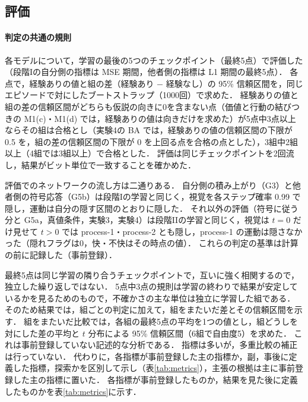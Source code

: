 \subsection{評価}\label{sec:evaluation}

\paragraph{判定の共通の規則}
各モデルについて，学習の最後の5つのチェックポイント（最終5点）で評価した（段階Iの自分側の指標は MSE 期間，他者側の指標は L1 期間の最終5点）．
各点で，経験ありの値と組の差（経験あり $-$ 経験なし）の 95\% 信頼区間を，同じエピソードで対にしたブートストラップ（1000回）で求めた．
経験ありの値と組の差の信頼区間がどちらも仮説の向きに0を含まない点（価値と行動の結びつきの M1(c)・M1(d) では，経験ありの値は向きだけを求めた）が5点中3点以上ならその組は合格とし（実験4の BA では，経験ありの値の信頼区間の下限が 0.5 を，組の差の信頼区間の下限が 0 を上回る点を合格の点とした），3組中2組以上（4組では3組以上）で合格とした．
評価は同じチェックポイントを2回流し，結果がビット単位で一致することを確かめた．

評価でのネットワークの流し方は二通りある．
自分側の積み上がり（G3）と他者側の符号応答（G5b）は段階Iの学習と同じく，視覚を各ステップ確率 0.99 で隠し，運動は自分の隠す区間のとおりに隠した．
それ以外の評価（符号に従う分と G5a，真値条件，実験3，実験4）は段階IIの学習と同じく，視覚は $t=0$ だけ見せて $t>0$ では process-1・process-2 とも隠し，process-1 の運動は隠さなかった（隠れフラグは0，快・不快はその時点の値）．
これらの判定の基準は計算の前に記録した（事前登録）．

最終5点は同じ学習の隣り合うチェックポイントで，互いに強く相関するので，独立した繰り返しではない．
5点中3点の規則は学習の終わりで結果が安定しているかを見るためのもので，不確かさの主な単位は独立に学習した組である．
そのため結果では，組ごとの判定に加えて，組をまたいだ差とその信頼区間を示す．
組をまたいだ比較では，各組の最終5点の平均を1つの値とし，組どうしを対にした差の平均と $t$ 分布による 95\% 信頼区間（6組で自由度5）を求めた．
これは事前登録していない記述的な分析である．
指標は多いが，多重比較の補正は行っていない．
代わりに，各指標が事前登録した主の指標か，副，事後に定義した指標，探索かを区別して示し（表\ref{tab:metrics}），主張の根拠は主に事前登録した主の指標に置いた．
各指標が事前登録したものか，結果を見た後に定義したものかを表\ref{tab:metrics}に示す．

